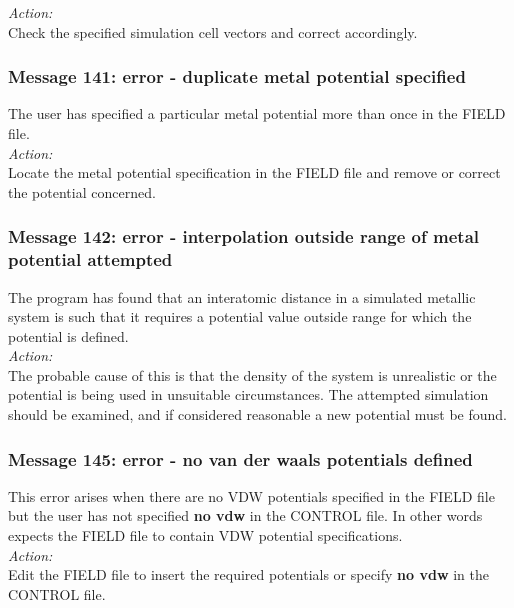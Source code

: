 \noindent
{\em Action:} \\ 
Check the specified simulation cell vectors and correct accordingly.

\subsubsection*{Message 141: error - duplicate metal potential specified}

The user has specified a particular metal potential more than once in
the FIELD file. \\

\noindent
{\em Action:} \\ 
Locate the metal potential specification in the FIELD file and remove
or correct the potential concerned. \\

\subsubsection*{Message 142: error - interpolation outside range of 
metal potential attempted}

The program has found that an interatomic distance in a simulated metallic
system is such that it requires a potential value outside range for which the
potential is defined. \\

\noindent
{\em Action:} \\ 
The probable cause of this is that the density of the system is unrealistic or
the potential is being used in unsuitable circumstances. The attempted
simulation should be examined, and if considered reasonable a new potential
must be found. \\

\subsubsection*{Message 145: error - no van der waals potentials defined}

This error arises when there are no VDW potentials specified in the
FIELD file but the user has not specified {\bf no vdw} in the CONTROL
file.  In other words \D{} expects the FIELD file to contain VDW
potential specifications. \\

\noindent
{\em Action:} \\ 
Edit the FIELD file to insert the required potentials  or specify {\bf
no vdw} in the CONTROL file.

